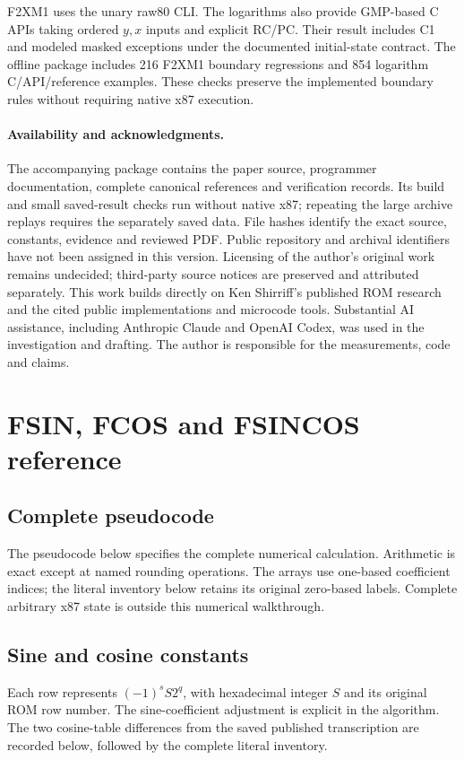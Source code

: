 \documentclass[11pt]{article}
\begin{document}
F2XM1 uses the unary raw80 CLI. The logarithms also provide GMP-based C
APIs taking ordered $y,x$ inputs and explicit RC/PC. Their result includes
C1 and modeled masked exceptions under the documented initial-state contract.
The offline package includes 216 F2XM1 boundary regressions and 854 logarithm
C/API/reference examples. These checks preserve the implemented boundary
rules without requiring native x87 execution.

\paragraph{Availability and acknowledgments.}
The accompanying package contains the paper source, programmer documentation,
complete canonical references and verification records. Its build and small
saved-result checks run without native x87; repeating the large archive
replays requires the separately saved data. File hashes identify the exact
source, constants, evidence and reviewed PDF. Public repository and
archival identifiers have not been assigned in this version. Licensing of
the author's original work remains undecided; third-party source notices
are preserved and attributed separately. This work builds directly on Ken
Shirriff's published ROM research and the cited public implementations and
microcode tools. Substantial AI assistance, including Anthropic Claude and
OpenAI Codex, was used in the investigation and drafting. The author is
responsible for the measurements, code and claims.


\begingroup\small\raggedright

\endgroup

\clearpage
\appendix
\section{FSIN, FCOS and FSINCOS reference}
\label{app:trig}

\subsection{Complete pseudocode}
The pseudocode below specifies the complete numerical calculation.
Arithmetic is exact except at named rounding operations. The arrays use
one-based coefficient indices; the literal inventory below retains its
original zero-based labels. Complete arbitrary x87 state is outside this
numerical walkthrough.


\subsection{Sine and cosine constants}
\label{app:trig-constants}
Each row represents $(-1)^s S2^q$, with hexadecimal integer $S$ and its
original ROM row number. The sine-coefficient adjustment is explicit in
the algorithm. The two cosine-table differences from the saved published
transcription are recorded below, followed by the complete literal inventory.
\end{document}
